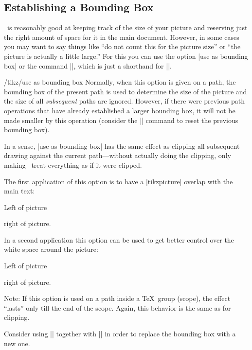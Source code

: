 \subsection{Establishing a Bounding Box}

\pgfname\ is reasonably good at keeping track of the size of your picture
and reserving just the right amount of space for it in the main
document. However, in some cases you may want to say things like
``do not count this for the picture size'' or ``the picture is
actually a little large.'' For this you can use the option
|use as bounding box| or the command |\useasboundingbox|, which is just
a shorthand for ||.

\begin{key}{/tikz/use as bounding box}
  Normally, when this option is given on a path, the bounding box of
  the present path is used to determine the size of the picture and
  the size of all \emph{subsequent} paths are
  ignored. However, if there were previous path operations that have
  already established a larger bounding box, it will not be made
  smaller by this operation (consider the |\pgfresetboundingbox| command
  to reset the previous bounding box).

  In a sense, |use as bounding box| has the same effect as clipping
  all subsequent drawing against the current path---without actually
  doing the clipping, only making \pgfname\ treat everything as if it
  were clipped.

  The first application of this option is to have a |{tikzpicture}|
  overlap with the main text:

\begin{codeexample}[]
Left of pictureright of picture.
\end{codeexample}

  In a second application this option can be used to get better
  control over the white space around the picture:

\begin{codeexample}[]
Left of picture
right of picture.
\end{codeexample}

  Note: If this option is used on a path inside a \TeX\ group (scope),
  the effect ``lasts'' only till the end of the scope. Again, this
  behavior is the same as for clipping.


  Consider using |\useasboundingbox| together with |\pgfresetboundingbox| in order to replace the bounding box with a new one.
\end{key}


